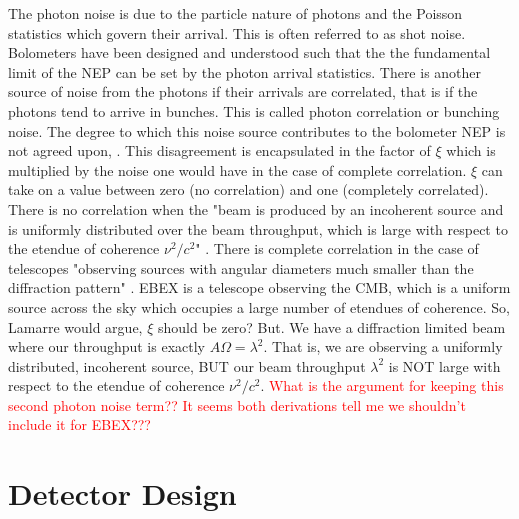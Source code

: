 The photon noise is due to the particle nature of photons and the Poisson statistics which govern their arrival. 
This is often referred to as shot noise.
Bolometers have been designed and understood such that the the fundamental limit of the \ac{NEP} can be set by the photon arrival statistics. 
There is another source of noise from the photons if their arrivals are correlated, that is if the photons tend to arrive in bunches. 
This is called photon correlation or bunching noise. 
The degree to which this noise source contributes to the bolometer \ac{NEP} is not agreed upon, \cite{Richards}. 
This disagreement is encapsulated in the factor of $\xi$ which is multiplied by the noise one would have in the case of complete correlation.
$\xi$ can take on a value between zero (no correlation) and one (completely correlated).
There is no correlation when the "beam is produced by an incoherent source and is uniformly distributed over the beam throughput, which is large with respect to the etendue of coherence $\nu^{2}/c^{2}$" \cite{Lamarre}.
There is complete correlation in the case of telescopes "observing sources with angular diameters much smaller than the diffraction pattern" \cite{Lamarre}. 
\ac{EBEX} is a telescope observing the \ac{CMB}, which is a uniform source across the sky which occupies a large number of etendues of coherence. 
So, Lamarre would argue, $\xi$ should be zero?
But. We have a diffraction limited beam where our throughput is exactly $A\Omega = \lambda^{2}$. That is, we are observing a uniformly distributed, incoherent source, BUT our beam throughput $\lambda^{2}$ is NOT large with respect to the etendue of coherence $\nu^{2}/c^{2}$. 
\textcolor{red}{What is the argument for keeping this second photon noise term?? It seems both derivations tell me we shouldn't include it for \ac{EBEX}???}





\section{Detector Design}
\label{sec:detector_design}

